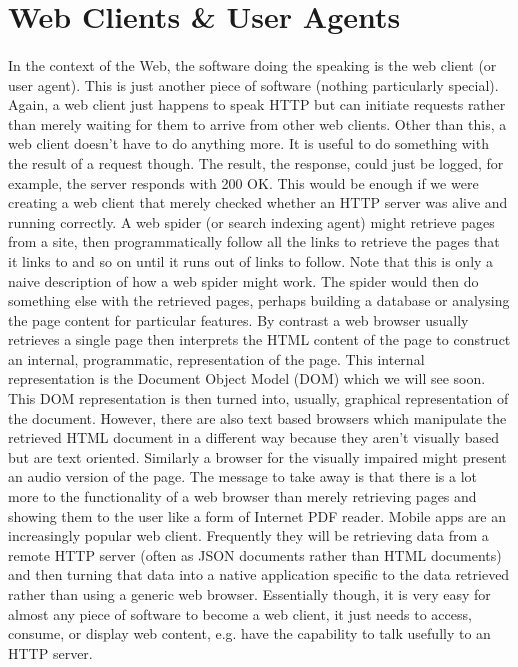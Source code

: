 \section{Web Clients \& User Agents}
\paragraph{} In the context of the Web, the software doing the speaking is the web client (or user agent). This is just another piece of software (nothing particularly special). Again, a web client just happens to speak HTTP but can initiate requests rather than merely waiting for them to arrive from other web clients. Other than this, a web client doesn't have to do anything more. It is useful to do something with the result of a request though. The result, the response, could just be logged, for example, the server responds with 200 OK. This would be enough if we were creating a web client that merely checked whether an HTTP server was alive and running correctly. A web spider (or search indexing agent) might retrieve pages from a site, then programmatically follow all the links to retrieve the pages that it links to and so on until it runs out of links to follow. Note that this is only a naive description of how a web spider might work. The spider would then do something else with the retrieved pages, perhaps building a database or analysing the page content for particular features. By contrast a web browser usually retrieves a single page then interprets the HTML content of the page to construct an internal, programmatic, representation of the page. This internal representation is the Document Object Model (DOM) which we will see soon. This DOM representation is then turned into, usually, graphical representation of the document. However, there are also text based browsers which manipulate the retrieved HTML document in a different way because they aren't visually based but are text oriented. Similarly a browser for the visually impaired might present an audio version of the page. The message to take away is that there is a lot more to the functionality of a web browser than merely retrieving pages and showing them to the user like a form of Internet PDF reader. Mobile apps are an increasingly popular web client. Frequently they will be retrieving data from a remote HTTP server (often as JSON documents rather than HTML documents) and then turning that data into a native application specific to the data retrieved rather than using a generic web browser. Essentially though, it is very easy for almost any piece of software to become a web client, it just needs to access, consume, or display web content, e.g. have the capability to talk usefully to an HTTP server.
